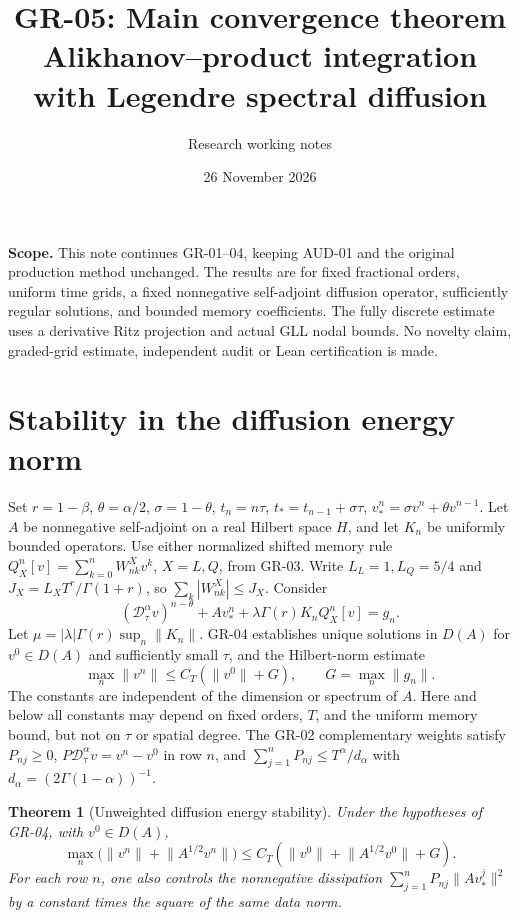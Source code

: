 \documentclass[11pt,a4paper]{article}
\title{GR-05: Main convergence theorem\\\large Alikhanov--product integration with Legendre spectral diffusion}
\author{Research working notes}
\date{26 November 2026}
\newtheorem{theorem}{Theorem}
\newcommand{\norm}[1]{\lVert#1\rVert}
\newcommand{\D}{\mathcal D_\tau^\alpha}
\begin{document}
\maketitle
\noindent\textbf{Scope.} This note continues GR-01--04, keeping AUD-01 and the original production method unchanged. The results are for fixed fractional orders, uniform time grids, a fixed nonnegative self-adjoint diffusion operator, sufficiently regular solutions, and bounded memory coefficients. The fully discrete estimate uses a derivative Ritz projection and actual GLL nodal bounds. No novelty claim, graded-grid estimate, independent audit or Lean certification is made.
\section{Stability in the diffusion energy norm}
Set $r=1-\beta$, $\theta=\alpha/2$, $\sigma=1-\theta$, $t_n=n\tau$, $t_*=t_{n-1}+\sigma\tau$, $v_*^n=\sigma v^n+\theta v^{n-1}$. Let $A$ be nonnegative self-adjoint on a real Hilbert space $H$, and let $K_n$ be uniformly bounded operators. Use either normalized shifted memory rule $Q_X^n[v]=\sum_{k=0}^n W^X_{nk}v^k$, $X=L,Q$, from GR-03. Write $L_L=1,L_Q=5/4$ and $J_X=L_X T^r/\Gamma(1+r)$, so $\sum_k|W^X_{nk}|\le J_X$. Consider
\begin{equation}\label{eq:scheme}
 (\D v)^{n-\theta}+Av_*^n+\lambda\Gamma(r)K_n Q_X^n[v]=g_n.
\end{equation}
Let $\mu=|\lambda|\Gamma(r)\sup_n\norm{K_n}$. GR-04 establishes unique solutions in $D(A)$ for $v^0\in D(A)$ and sufficiently small $\tau$, and the Hilbert-norm estimate
\begin{equation}\label{eq:l2stab}
 \max_n\norm{v^n}\le C_T(\norm{v^0}+G),\qquad G=\max_n\norm{g_n}.
\end{equation}
The constants are independent of the dimension or spectrum of $A$. Here and below all constants may depend on fixed orders, $T$, and the uniform memory bound, but not on $\tau$ or spatial degree. The GR-02 complementary weights satisfy $P_{nj}\ge0$, $P\D v=v^n-v^0$ in row $n$, and $\sum_{j=1}^nP_{nj}\le T^\alpha/d_\alpha$ with $d_\alpha=(2\Gamma(1-\alpha))^{-1}$.
\begin{theorem}[Unweighted diffusion energy stability]\label{thm:energy}
Under the hypotheses of GR-04, with $v^0\in D(A)$,
\[
 \max_n\big(\norm{v^n}+\norm{A^{1/2}v^n}\big)
 \le C_T(\norm{v^0}+\norm{A^{1/2}v^0}+G).
\]
For each row $n$, one also controls the nonnegative dissipation $\sum_{j=1}^nP_{nj}\norm{Av_*^j}^2$ by a constant times the square of the same data norm.
\end{theorem}
\end{document}
